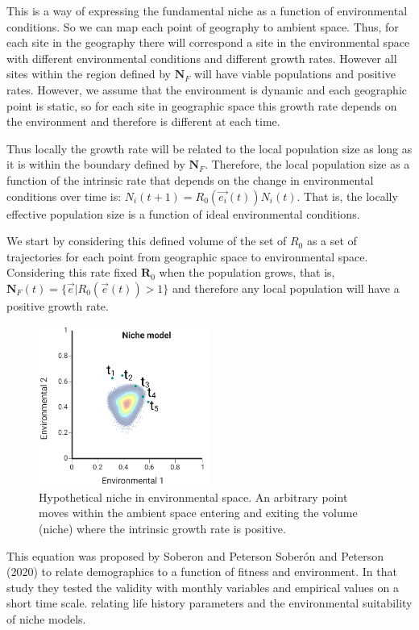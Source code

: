 \documentclass[
]{article}
\begin{document}
This is a way of expressing the fundamental niche as a function of
environmental conditions. So we can map each point of geography to
ambient space. Thus, for each site in the geography there will
correspond a site in the environmental space with different
environmental conditions and different growth rates. However all sites
within the region defined by \(\mathbf{N}_F\) will have viable
populations and positive rates. However, we assume that the environment
is dynamic and each geographic point is static, so for each site in
geographic space this growth rate depends on the environment and
therefore is different at each time.

Thus locally the growth rate will be related to the local population
size as long as it is within the boundary defined by \(\mathbf{N}_F\).
Therefore, the local population size as a function of the intrinsic rate
that depends on the change in environmental conditions over time is:
\(N_i(t+1) = R_0(\vec{e_i}(t) ) N_i(t)\). That is, the locally effective
population size is a function of ideal environmental conditions.

We start by considering this defined volume of the set of \(R_0\) as a
set of trajectories for each point from geographic space to
environmental space. Considering this rate fixed \(\mathbf{R}_0\) when
the population grows, that is,
\(\mathbf{N}_F(t) = \{\vec{e} | R_0(\vec{e}(t)) > 1 \}\) and therefore
any local population will have a positive growth rate.

\begin{figure}
\centering
\includegraphics[width=0.5\textwidth,height=\textheight]{all_figures/figure_1.png}
\caption{Hypothetical niche in environmental space. An arbitrary point
moves within the ambient space entering and exiting the volume (niche)
where the intrinsic growth rate is positive.}
\end{figure}

This equation was proposed by Soberon and Peterson Soberón and Peterson
(2020) to relate demographics to a function of fitness and environment.
In that study they tested the validity with monthly variables and
empirical values on a short time scale. relating life history parameters
and the environmental suitability of niche models.
\end{document}
